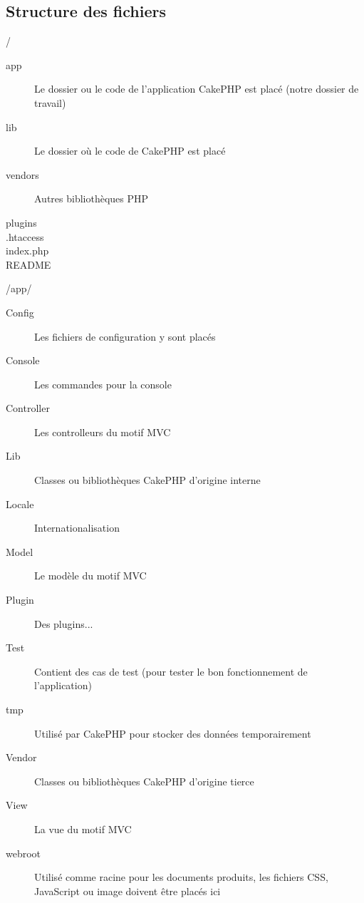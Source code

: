\subsection{Structure des fichiers}

\begin{frame}{/}
\begin{description}
  \item [app] Le dossier ou le code de l'application CakePHP est placé (notre dossier de travail)
  \item [lib] Le dossier où le code de CakePHP est placé
  \item [vendors] Autres bibliothèques PHP
  \item [plugins]
  \item [.htaccess]
  \item [index.php]
  \item [README]
\end{description}
\end{frame}

\begin{frame}{/app/}
\begin{description}
  \item [Config] Les fichiers de configuration y sont placés
  \item [Console] Les commandes pour la console
  \item [Controller] Les controlleurs du motif MVC
  \item [Lib] Classes ou bibliothèques CakePHP d'origine interne
  \item [Locale] Internationalisation
  \item [Model] Le modèle du motif MVC
  \item [Plugin] Des plugins...
  \item [Test] Contient des cas de test (pour tester le bon fonctionnement de l'application)
  \item [tmp] Utilisé par CakePHP pour stocker des données temporairement
  \item [Vendor] Classes ou bibliothèques CakePHP d'origine tierce
  \item [View] La vue du motif MVC
  \item [webroot] Utilisé comme racine pour les documents produits, les fichiers CSS, JavaScript ou image doivent être placés ici
\end{description}
\end{frame}

